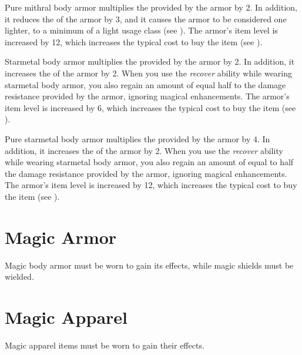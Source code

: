          Pure mithral body armor multiplies the  provided by the armor by 2.
        In addition, it reduces the  of the armor by 3, and it causes the armor to be considered one  lighter, to a minimum of a light usage class (see ).
        The armor's item level is increased by 12, which increases the typical cost to buy the item (see ).

         Starmetal body armor multiplies the  provided by the armor by 2.
        In addition, it increases the  of the armor by 2.
        When you use the \textit{recover} ability while wearing starmetal body armor, you also regain an amount of  equal half to the damage resistance provided by the armor, ignoring magical enhancements.
        The armor's item level is increased by 6, which increases the typical cost to buy the item (see ).

         Pure starmetal body armor multiplies the  provided by the armor by 4.
        In addition, it increases the  of the armor by 2.
        When you use the \textit{recover} ability while wearing starmetal body armor, you also regain an amount of  equal to half the damage resistance provided by the armor, ignoring magical enhancements.
        The armor's item level is increased by 12, which increases the typical cost to buy the item (see ).

\newpage
\section{Magic Armor}
    Magic body armor must be worn to gain its effects, while magic shields must be wielded.

    

    

\newpage
\section{Magic Apparel}
    Magic apparel items must be worn to gain their effects.

